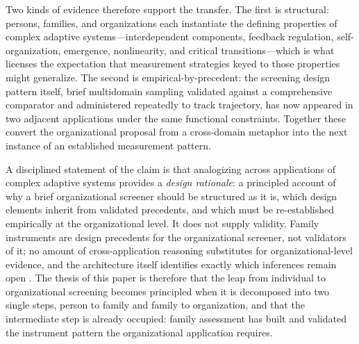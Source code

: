 \documentclass[12pt, letterpaper]{article}
\begin{document}
Two kinds of evidence therefore support the transfer. The first is structural: persons, families, and organizations each instantiate the defining properties of complex adaptive systems---interdependent components, feedback regulation, self-organization, emergence, nonlinearity, and critical transitions---which is what licenses the expectation that measurement strategies keyed to those properties might generalize. The second is empirical-by-precedent: the screening design pattern itself, brief multidomain sampling validated against a comprehensive comparator and administered repeatedly to track trajectory, has now appeared in two adjacent applications under the same functional constraints. Together these convert the organizational proposal from a cross-domain metaphor into the next instance of an established measurement pattern.

A disciplined statement of the claim is that analogizing across applications of complex adaptive systems provides a \emph{design rationale}: a principled account of why a brief organizational screener should be structured as it is, which design elements inherit from validated precedents, and which must be re-established empirically at the organizational level. It does not supply validity. Family instruments are design precedents for the organizational screener, not validators of it; no amount of cross-application reasoning substitutes for organizational-level evidence, and the architecture itself identifies exactly which inferences remain open \parencite{kane2006,aera2014}. The thesis of this paper is therefore that the leap from individual to organizational screening becomes principled when it is decomposed into two single steps, person to family and family to organization, and that the intermediate step is already occupied: family assessment has built and validated the instrument pattern the organizational application requires.
\end{document}
